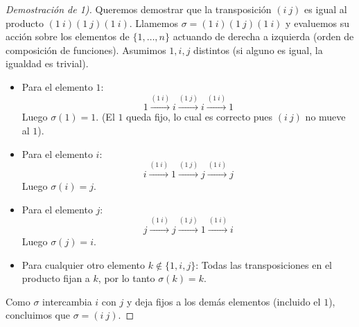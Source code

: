 \begin{proof}[Demostración de 1)]
    Queremos demostrar que la transposición $(i \ j)$ es igual al producto $(1 \ i)(1 \ j)(1 \ i)$.
    Llamemos $\sigma = (1 \ i)(1 \ j)(1 \ i)$ y evaluemos su acción sobre los elementos de $\{1, \dots, n\}$ actuando de derecha a izquierda (orden de composición de funciones). Asumimos $1, i, j$ distintos (si alguno es igual, la igualdad es trivial).

    \begin{itemize}
        \item Para el elemento $1$:
        \begin{equation*}
            1 \xrightarrow{(1 \ i)} i \xrightarrow{(1 \ j)} i \xrightarrow{(1 \ i)} 1
        \end{equation*}
        Luego $\sigma(1) = 1$. (El $1$ queda fijo, lo cual es correcto pues $(i \ j)$ no mueve al $1$).

        \item Para el elemento $i$:
        \begin{equation*}
            i \xrightarrow{(1 \ i)} 1 \xrightarrow{(1 \ j)} j \xrightarrow{(1 \ i)} j
        \end{equation*}
        Luego $\sigma(i) = j$.

        \item Para el elemento $j$:
        \begin{equation*}
            j \xrightarrow{(1 \ i)} j \xrightarrow{(1 \ j)} 1 \xrightarrow{(1 \ i)} i
        \end{equation*}
        Luego $\sigma(j) = i$.

        \item Para cualquier otro elemento $k \notin \{1, i, j\}$:
        Todas las transposiciones en el producto fijan a $k$, por lo tanto $\sigma(k) = k$.
    \end{itemize}

    Como $\sigma$ intercambia $i$ con $j$ y deja fijos a los demás elementos (incluido el $1$), concluimos que $\sigma = (i \ j)$.
\end{proof}

